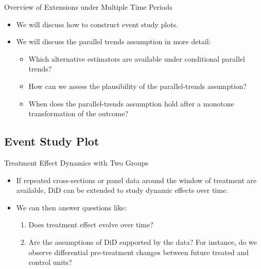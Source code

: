 \documentclass[11pt,aspectratio=169]{beamer}
\begin{document}
\begin{frame}{Overview of Extensions under Multiple Time Periods}
\begin{itemize}
  \item We will discuss how to construct event study plots.
  \item We will discuss the parallel trends assumption in more detail:
  \begin{itemize}
    \item Which alternative estimators are available under conditional parallel trends?
    \item How can we assess the plausibility of the parallel-trends assumption?
    \item When does the parallel-trends assumption hold after a monotone transformation of the outcome?
  \end{itemize}
\end{itemize}
\end{frame}


\subsection{Event Study Plot}

\begin{frame}{Treatment Effect Dynamics with Two Groups}
\begin{itemize}
  \item If repeated cross-sections or panel data around the window of treatment are available, DiD can be extended to study dynamic effects over time.
  \item We can then answer questions like:
  \begin{enumerate}
    \item Does treatment effect evolve over time?
    \item Are the assumptions of DiD supported by the data? For instance, do we observe differential pre-treatment changes between future treated and control units?
  \end{enumerate}
\end{itemize}
\end{frame}
\end{document}
